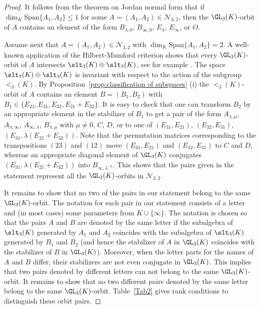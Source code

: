 \documentclass[12pt]{amsart}
\newcommand{\field}{K}
\begin{document}
\begin{proof} 
It follows from the theorem on Jordan normal form that if \linebreak $\dim_\field\mathrm{Span}\{A_1,A_2\}\le 1$ 
for some $A=(A_1,A_2)\in \mathcal{N}_{3,2}$, then 
the $\GL_3(\field)$-orbit of $A$ contains an element of the form 
$B_{\lambda,0}$, $B_{\infty,0}$, $E_\lambda$, $E_\infty$, or $O$. 

Assume next that $A=(A_1,A_2)\in \mathcal{N}_{3,2}$ with 
$\dim_\field\mathrm{Span}\{A_1,A_2\}=2$.  
A well-known application of the Hilbert-Mumford criterion shows that every $\GL_3(\field)$-orbit of $A$ intersects $\slt_3(\field)\oplus \slt_3(\field)$, see for example \cite{kraft}. 
The space $\slt_3(\field)\oplus \slt_3(\field)$ is invariant with respect to the action of the subgroup 
$\lt_3(\field)$. 
By Proposition~\ref{prop:classification of subspaces} (i) the $\lt_3(\field)$-orbit of $A$ 
contains an element $B=(B_1,B_2)$ with  
$B_1\in \{E_{21}, E_{31}, E_{32}, E_{21}+E_{32}\}$. It is easy to check 
that one can transform $B_2$ by an appropriate element in the stabilizer of $B_1$ 
to get a pair of the form 
$A_{\lambda,\mu}$, $A_{\lambda,\infty}$, $A_{\infty,\lambda}$, $B_{\lambda,\mu}$ with $\mu\neq 0$, 
$C$, $D$, or to one of 
$(E_{31},E_{21})$, $(E_{32},E_{31})$, 
$(E_{31},\lambda(E_{21}+E_{32}))$.  Note that the permutation matrices corresponding to the transpositions 
$(23)$ and $(12)$ move $(E_{31},E_{21})$ and $(E_{32},E_{31})$ to $C$ and $D$, whereas 
an appropriate diagonal element of $\GL_3(\field)$ conjugates $(E_{31},\lambda(E_{21}+E_{32}))$ into 
$B_{\infty,\lambda^{-2}}$. This shows that the pairs given in the statement represent all the 
$\GL_3(\field)$-orbits in $\mathcal{N}_{3,2}$. 

It remains to show that no two of the pairs in our statement belong to the same $\GL_3(\field)$-orbit. 
The notation for each pair in our statement consists of a letter and (in most cases) some parameters 
from $\field\cup\{\infty\}$. 
The notation  is chosen so that the pairs $A$ and $B$ are denoted by the same letter 
if the subalgebra of $\slt_3(\field)$ generated by $A_1$ and $A_2$ coincides with the subalgebra of 
$\slt_3(\field)$ generated by $B_1$ and $B_2$ (and hence the stabilizer of $A$ in $\GL_3(\field)$ 
coincides with the stabilizer of $B$ in $\GL_3(\field)$). Moreover, when the letter parts for the 
names of $A$ and $B$ differ, their stabilizers are not even conjugate in $\GL_3(\field)$. 
This implies that two pairs denoted by 
different letters can not belong to the same $\GL_3(\field)$-orbit. 
It remains to show that no two different pairs denoted by the same letter 
belong to the same $\GL_3(\field)$-orbit. 
Table~\ref{Tab2} gives rank conditions to distinguish these orbit pairs.
\end{proof}
\end{document}
